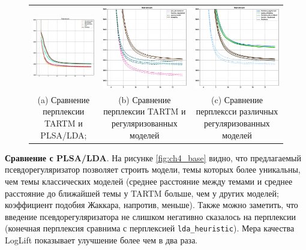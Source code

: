 \begin{figure} 
\begin{tabular}{ccc} 
    \includegraphics[width=55mm]{images/CH4_baselines_PerplexityScore.eps} &   \includegraphics[width=55mm]{images/CH4_vs_regularized_PerplexityScore.eps} & \includegraphics[width=55mm]{images/CH4_improved_PerplexityScore.eps} \\ 
    (a) Сравнение перплексии TARTM и PLSA/LDA; & (b) Сравнение перплексии TARTM и регуляризованных моделей & (c) Сравнение перплексси различных регуляризованных моделей \\[6pt] 
\end{tabular} 
\label{fig:Perple3x} 
\end{figure} 

\textbf{Сравнение с PLSA/LDA}. На рисунке \ref{fig:ch4_base} видно, что предлагаемый псевдорегуляризатор позволяет строить модели, темы которых более уникальны, чем темы классических моделей (среднее расстояние между темами и среднее расстояние до ближайшей темы у TARTM больше, чем у других моделей; коэффициент подобия Жаккара, напротив, меньше). Также можно заметить, что введение псевдорегуляризатора не слишком негативно сказалось на перплексии (конечная перплексия сравнима с перплексией \texttt{lda\_heuristic}). Мера качества LogLift показывает улучшение более чем в два раза.  

